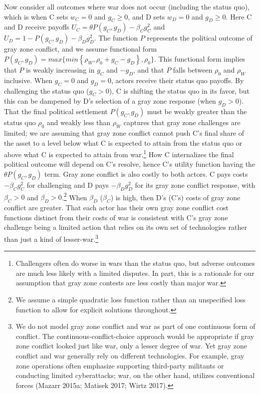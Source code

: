 \documentclass[
]{article}
\begin{document}
Now consider all outcomes where war does not occur (including the status quo), which is when C sets \(w_{C}=0\) and \(g_{C}\geq0\), and D sets \(w_{D}=0\) and \(g_{D}\geq0\). Here C and D receive payoffs \(U_{C}=\theta P(g_{C},g_{D})-\beta_{C}g_{C}^{2}\) and \(U_{D}=1-P(g_{C},g_{D})-\beta_{D}g_{D}^{2}\). The function \(P\) represents the political outcome of gray zone conflict, and we assume functional form \(P(g_{C},g_{D})=max\{min\left\{ \rho_W,\rho_{0}+g_{C}-g_{D}\right\} ,\rho_{0}\}\). This functional form implies that \(P\) is weakly increasing in \(g_{C}\) and \(-g_{D}\), and that \(P\) falls between \(\rho_{0}\) and \(\rho_W\) inclusive. When \(g_{C}=0\) and \(g_{D}=0\), actors receive their status quo payoffs. By challenging the status quo (\(g_{C}>0\)), C is shifting the status quo in its favor, but this can be dampened by D's selection of a gray zone response (when \(g_{D}>0\)). That the final political settlement \(P(g_{C},g_{D})\) must be weakly greater than the status quo \(\rho_{0}\) and weakly less than \(\rho_W\) captures that gray zone challenges are limited; we are assuming that gray zone conflict cannot push C's final share of the asset to a level below what C is expected to attain from the status quo or above what C is expected to attain from war.\footnote{Challengers often do worse in wars than the status quo, but adverse outcomes are much less likely with a limited disputes. In part, this is a rationale for our assumption that gray zone contests are less costly than major war.} How C internalizes the final political outcome will depend on C's resolve, hence C's utility function having the \(\theta P(g_{C},g_{D})\) term. Gray zone conflict is also costly to both actors. C pays costs \(-\beta_{C}g_{C}^{2}\) for challenging and D pays \(-\beta_{D}g_{D}^{2}\) for its gray zone conflict response, with \(\beta_{C}>0\) and \(\beta_{D}>0\).\footnote{We assume a simple quadratic loss function rather than an unspecified loss function to allow for explicit solutions throughout.} When \(\beta_{D}\) (\(\beta_{C}\)) is high, then D's (C's) costs of gray zone conflict are greater. That each actor has their own gray zone conflict cost functions distinct from their costs of war is consistent with C's gray zone challenge being a limited action that relies on its own set of technologies rather than just a kind of lesser-war.\footnote{We do not model gray zone conflict and war as part of one continuous form of conflict. The continuous-conflict-choice approach would be appropriate if gray zone conflict looked just like war, only a lesser degree of war. Yet gray zone conflict and war generally rely on different technologies. For example, gray zone operations often emphasize supporting third-party militants or conducting limited cyberattacks; war, on the other hand, utilizes conventional forces (Mazarr 2015a; Matisek 2017; Wirtz 2017).}
\end{document}
